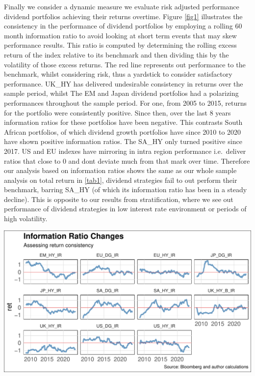 \documentclass[11pt,preprint, authoryear]{elsarticle}
\let\origfigure\figure
\let\endorigfigure\endfigure
\renewenvironment{figure}[1][2] {
    \expandafter\origfigure\expandafter[H]
} {
    \endorigfigure
}
\numberwithin{equation}{section}
\numberwithin{figure}{section}
\numberwithin{table}{section}
\begin{document}
Finally we consider a dynamic measure we evaluate risk adjusted
performance dividend portfolios achieving their returns overtime. Figure
\ref{fig1} illustrates the consistency in the performance of dividend
portfolios by employing a rolling 60 month information ratio to avoid
looking at short term events that may skew performance results. This
ratio is computed by determining the rolling excess return of the index
relative to its benchmark and then dividing this by the volatility of
those excess returns. The red line represents out performance to the
benchmark, whilst considering risk, thus a yardstick to consider
satisfactory performance. UK\_HY has delivered undesirable consistency
in returns over the sample period, whilst The EM and Japan dividend
portfolios had a polarizing performances throughout the sample period.
For one, from 2005 to 2015, returns for the portfolio were consistently
positive. Since then, over the last 8 years information ratios for these
portfolios have been negative. This contrasts South African portfolios,
of which dividend growth portfolios have since 2010 to 2020 have shown
positive information ratios. The SA\_HY only turned positive since 2017.
US and EU indexes have mirroring in intra region performance
i.e.~deliver ratios that close to 0 and dont deviate much from that mark
over time. Therefore our analysis based on information ratios shows the
same as our whole sample analysis on total return in \ref{tab1},
dividend strategies fail to out perform their benchmark, barring SA\_HY
(of which its information ratio has been in a steady decline). This is
opposite to our results from stratification, where we see out
performance of dividend strategies in low interest rate environment or
periods of high volatility.

\begin{figure}[H]

\includegraphics{Much_Ado_About_Dividends_files/figure-latex/unnamed-chunk-1-1} \hfill{}

\caption{Rolling 3 Year Returns \label{fig1}}\label{fig:unnamed-chunk-1}
\end{figure}
\end{document}
